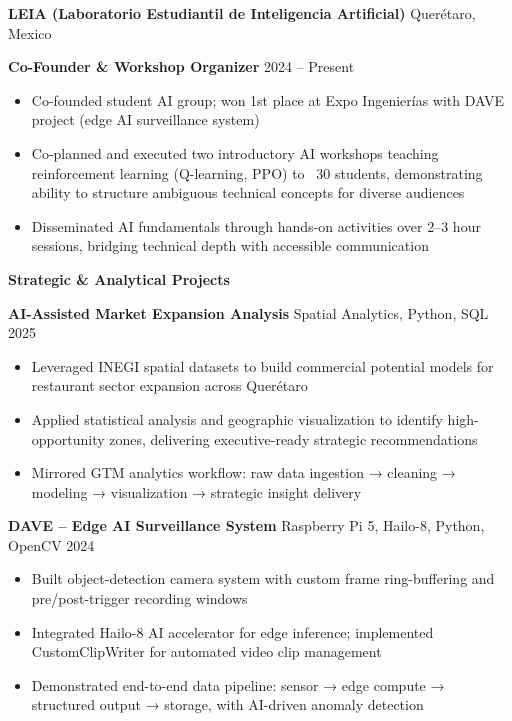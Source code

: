 \documentclass[11pt]{article}
\begin{document}
\vspace{12pt}

\textbf{LEIA (Laboratorio Estudiantil de Inteligencia Artificial)} \hfill Querétaro, Mexico

\textbf{Co-Founder \& Workshop Organizer} \hfill 2024 – Present
\begin{itemize}[noitemsep, topsep=0pt, partopsep=0pt, parsep=0pt]
    \item Co-founded student AI group; won 1st place at Expo Ingenierías with DAVE project (edge AI surveillance system)
    \item Co-planned and executed two introductory AI workshops teaching reinforcement learning (Q-learning, PPO) to ~30 students, demonstrating ability to structure ambiguous technical concepts for diverse audiences
    \item Disseminated AI fundamentals through hands-on activities over 2–3 hour sessions, bridging technical depth with accessible communication
\end{itemize}

\vspace{12pt}

\begin{center}
    \textbf{Strategic \& Analytical Projects}
\end{center}
\textbf{AI-Assisted Market Expansion Analysis} \hfill Spatial Analytics, Python, SQL \hfill 2025
\begin{itemize}[noitemsep, topsep=0pt, partopsep=0pt, parsep=0pt]
    \item Leveraged INEGI spatial datasets to build commercial potential models for restaurant sector expansion across Querétaro
    \item Applied statistical analysis and geographic visualization to identify high-opportunity zones, delivering executive-ready strategic recommendations
    \item Mirrored GTM analytics workflow: raw data ingestion → cleaning → modeling → visualization → strategic insight delivery
\end{itemize}

\vspace{6pt}

\textbf{DAVE – Edge AI Surveillance System} \hfill Raspberry Pi 5, Hailo-8, Python, OpenCV \hfill 2024
\begin{itemize}[noitemsep, topsep=0pt, partopsep=0pt, parsep=0pt]
    \item Built object-detection camera system with custom frame ring-buffering and pre/post-trigger recording windows
    \item Integrated Hailo-8 AI accelerator for edge inference; implemented CustomClipWriter for automated video clip management
    \item Demonstrated end-to-end data pipeline: sensor → edge compute → structured output → storage, with AI-driven anomaly detection
\end{itemize}
\end{document}
